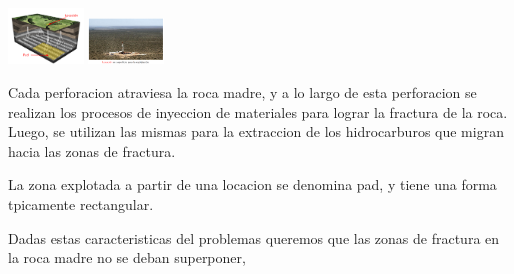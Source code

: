\begin{center}
\includegraphics[width=0.15\textwidth]{imagenes/figura2}
\includegraphics[width=0.15\textwidth]{imagenes/figura3}
\end{center}

Cada perforacion atraviesa la roca madre, y a lo largo de esta perforacion
se realizan los procesos de inyeccion de materiales para lograr la fractura de
la roca. Luego, se utilizan las mismas para la extraccion de los hidrocarburos
que migran hacia las zonas de fractura.

La zona
explotada a partir de una locacion se denomina pad, y tiene una forma tpicamente
rectangular.

Dadas estas caracteristicas del problemas queremos que las zonas de fractura en la roca madre no se deban superponer,